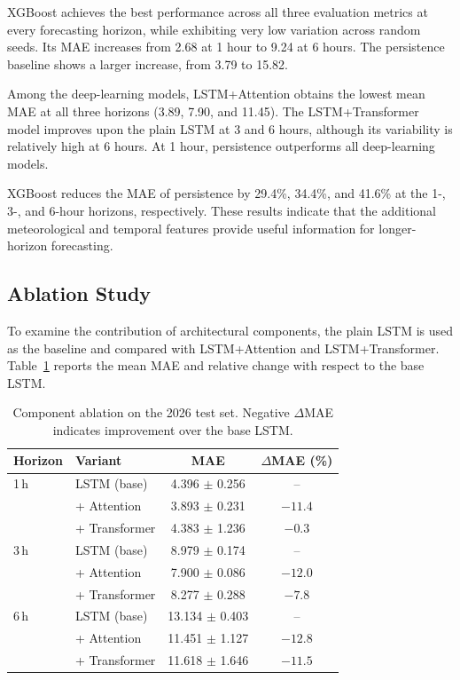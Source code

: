 \documentclass[conference]{IEEEtran}
\begin{document}
XGBoost achieves the best performance across all three evaluation metrics at every forecasting horizon, while exhibiting very low variation across random seeds. Its MAE increases from 2.68 at 1 hour to 9.24 at 6 hours. The persistence baseline shows a larger increase, from 3.79 to 15.82.

Among the deep-learning models, LSTM+Attention obtains the lowest mean MAE at all three horizons (3.89, 7.90, and 11.45). The LSTM+Transformer model improves upon the plain LSTM at 3 and 6 hours, although its variability is relatively high at 6 hours. At 1 hour, persistence outperforms all deep-learning models.

XGBoost reduces the MAE of persistence by 29.4\%, 34.4\%, and 41.6\% at the 1-, 3-, and 6-hour horizons, respectively. These results indicate that the additional meteorological and temporal features provide useful information for longer-horizon forecasting.

\subsection{Ablation Study}

To examine the contribution of architectural components, the plain LSTM is used as the baseline and compared with LSTM+Attention and LSTM+Transformer. Table~\ref{tab:ablation} reports the mean MAE and relative change with respect to the base LSTM.

\begin{table}[htbp]
\caption{Component ablation on the 2026 test set. Negative \(\Delta\)MAE indicates improvement over the base LSTM.}
\label{tab:ablation}
\centering
\footnotesize
\begin{tabular}{llcc}
\toprule
Horizon & Variant & MAE & \(\Delta\)MAE (\%) \\
\midrule

1\,h & LSTM (base) & 4.396 \(\pm\) 0.256 & -- \\
& + Attention & 3.893 \(\pm\) 0.231 & \(-11.4\) \\
& + Transformer & 4.383 \(\pm\) 1.236 & \(-0.3\) \\

\midrule

3\,h & LSTM (base) & 8.979 \(\pm\) 0.174 & -- \\
& + Attention & 7.900 \(\pm\) 0.086 & \(-12.0\) \\
& + Transformer & 8.277 \(\pm\) 0.288 & \(-7.8\) \\

\midrule

6\,h & LSTM (base) & 13.134 \(\pm\) 0.403 & -- \\
& + Attention & 11.451 \(\pm\) 1.127 & \(-12.8\) \\
& + Transformer & 11.618 \(\pm\) 1.646 & \(-11.5\) \\

\bottomrule
\end{tabular}
\end{table}
\end{document}
